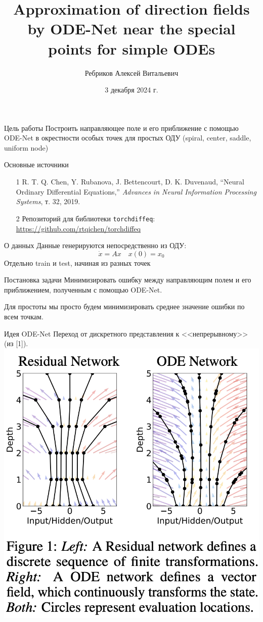 \documentclass{beamer}
\title[Direction fields]{Approximation of direction fields by ODE-Net near the special points for simple ODEs}
\author{Ребриков Алексей Витальевич}
\institute{Московский физико-технический институт \\ Lab 401 \\ Курс: Прогнозирование временных рядов}
\date{3 декабря 2024 г.}
\begin{document}
\frame{\titlepage}

\begin{frame}{Цель работы}
    Построить направляющее поле и его приближение с помощью ODE-Net в окрестности особых точек для простых ОДУ (spiral, center, saddle, uniform node)
\end{frame}

\begin{frame}{Основные источники}
    \begin{itemize}
        \item [1] R. T. Q. Chen, Y. Rubanova, J. Bettencourt, D. K. Duvenaud, “Neural Ordinary Differential Equations,” \textit{Advances in Neural Information Processing Systems}, т. 32, 2019.
        \item [2] Репозиторий для библиотеки \texttt{torchdiffeq}: \url{https://github.com/rtqichen/torchdiffeq} 
    \end{itemize}
\end{frame}

\begin{frame}{О данных}
    Данные генерируются непосредственно из ОДУ:
    $$ \dot{x} = A x \quad x(0) = x_0 $$
    Отдельно train и test, начиная из разных точек
\end{frame}

\begin{frame}{Постановка задачи}
    Минимизировать ошибку между направляющим полем и его приближением, полученным с помощью ODE-Net.

    \vspace{1em}
    Для простоты мы просто будем минимизировать среднее значение ошибки по всем точкам.

\end{frame}

\begin{frame}{Идея ODE-Net}
    Переход от дискретного представления к <<непрерывному>> (из [1]).
    \centering
    \includegraphics[width=0.6\linewidth]{../imgs/idea.png}
\end{frame}
\end{document}
